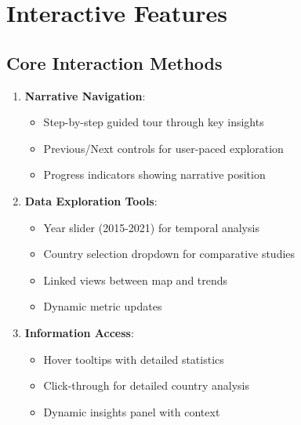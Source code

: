 \documentclass{article}
\begin{document}
\section{Interactive Features}
\subsection{Core Interaction Methods}
\begin{enumerate}
    \item \textbf{Narrative Navigation}:
        \begin{itemize}
            \item Step-by-step guided tour through key insights
            \item Previous/Next controls for user-paced exploration
            \item Progress indicators showing narrative position
        \end{itemize}
    \item \textbf{Data Exploration Tools}:
        \begin{itemize}
            \item Year slider (2015-2021) for temporal analysis
            \item Country selection dropdown for comparative studies
            \item Linked views between map and trends
            \item Dynamic metric updates
        \end{itemize}
    \item \textbf{Information Access}:
        \begin{itemize}
            \item Hover tooltips with detailed statistics
            \item Click-through for detailed country analysis
            \item Dynamic insights panel with context
        \end{itemize}
\end{enumerate}
\end{document}
